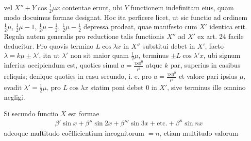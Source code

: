 vel $X''+Y\cos\frac12\mu x$ contentae erunt, ubi $Y$ functionem indefinitam eius, quam
modo docuimus formae designat. Hoc ita perficere licet, ut sic functio ad ordinem $\frac12\mu$, $\frac12\mu-1$, $\frac12\mu-\frac12$, $\frac12\mu-\frac12$ depressa prodeat, quae manifesto cum $X'$
identica erit. Regula autem generalis pro reductione talis functionis $X''$ ad $X'$
ex art. 24 facile deducitur. Pro quovis termino $L\cos\lambda x$ in $X''$ substitui debet
in $X'$, facto $\lambda=k\mu\pm\lambda'$, ita ut $\lambda'$ non sit maior quam $\frac12\mu$, terminus $\pm L\cos\lambda'x$,
ubi signum inferius accipiendum est, quoties simul $a=\frac{180^{{\mathord{0}}}}{\mu}$ atque $k$ par, superius in casibus reliquis; denique quoties in casu secundo, i. e. pro $a=\frac{180^{{\mathord{0}}}}{\mu}$
et valore pari ipsius $\mu$, evadit $\lambda'=\frac12\mu$, pro $L\cos\lambda x$ statim poni debet $0$ in
$X'$, sive terminus ille omnino negligi.


Si secundo functio $X$ est formae
\[
\begin{aligned}
&\beta'\sin x+\beta''\sin 2x+\beta'''\sin 3x+\mathrm{etc.}+\beta^n\sin nx
\end{aligned}
\]
adeoque multitudo coëfficientium incognitorum $=n$, etiam multitudo valorum
